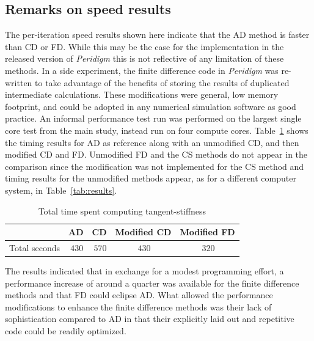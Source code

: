 \documentclass[preprint,12pt]{elsarticle}
\begin{document}
\subsection{Remarks on speed results}
%
The per-iteration speed results shown here indicate that the AD method is faster than CD or FD.  While this may be the case for the implementation in the released version of \emph{Peridigm} this is not reflective of any limitation of these methods. In a side experiment, the finite difference code in \emph{Peridigm} was re-written to take advantage of the benefits of storing the results of duplicated intermediate calculations. These modifications were general, low memory footprint, and could be adopted in any numerical simulation software as good practice. An informal performance test run was performed on the largest single core test from the main study, instead run on four compute cores. Table~\ref{tab:PerformanceMod} shows the timing results for AD as reference along with an unmodified CD, and then modified CD and FD. Unmodified FD and the CS methods do not appear in the comparison since the modification was not implemented for the CS method and timing results for the unmodified methods appear, as for a different computer system, in Table~\ref{tab:results}. 
%
\begin{table}[tbp]   
\centering 
\caption{Total time spent computing tangent-stiffness} 
\label{tab:PerformanceMod}   
\begin{tabular}{c c c c c}
\toprule & AD & CD & Modified CD & Modified FD\\
\midrule  Total seconds & $~430$ & $~570$ & $~430$ &$~320$ \\ 
\bottomrule 
\end{tabular} 
\end{table}

The results indicated that in exchange for a modest programming effort, a performance increase of around a quarter was available for the finite difference methods and that FD could eclipse AD. What allowed the performance modifications to enhance the finite difference methods was their lack of sophistication compared to AD in that their explicitly laid out and repetitive code could be readily optimized. 
\end{document}
